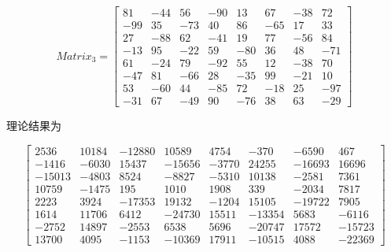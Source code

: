 \documentclass[UTF8]{ctexart}
\begin{document}
\begin{equation}
Matrix_3
=
\left[
\begin{array}{cccccccc}
    81 & -44 & 56 & -90 &  13 & 67 & -38 &  72\\
   -99 &  35 &-73 &  40 &  86 &-65 &  17 &  33\\
    27 & -88 & 62 & -41 &  19 & 77 & -56 &  84\\
   -13 &  95 &-22 &  59 & -80 & 36 &  48 & -71\\
    61 & -24 & 79 & -92 &  55 & 12 & -38 &  70\\
   -47 &  81 &-66 &  28 & -35 & 99 & -21 &  10\\
    53 & -60 & 44 & -85 &  72 &-18 &  25 & -97\\
   -31 &  67 &-49 &  90 & -76 & 38 &  63 & -29
\end{array}
\right]
\end{equation}

理论结果为

\begin{equation}
\left[
\begin{array}{cccccccc}
    
    2536  &  10184 & -12880 &  10589 &  4754  & -370   & -6590  &  467   \\
   -1416  & -6030  &  15437 & -15656 & -3770  &  24255 & -16693 &  16696 \\
   -15013 & -4803  &  8524  & -8827  & -5310  &  10138 & -2581  &  7361  \\
    10759 & -1475  &  195   &  1010  &  1908  &  339   & -2034  &  7817  \\
    2223  &  3924  & -17353 &  19132 & -1204  &  15105 & -19722 &  7905  \\
    1614  &  11706 &  6412  & -24730 &  15511 & -13354 &  5683  & -6116  \\
   -2752  &  14897 & -2553  &  6538  &  5696  & -20747 &  17572 & -15723 \\
    13700 &  4095  & -1153  & -10369 &  17911 & -10515 &  4088  & -22369
\end{array}
\right]
\end{equation}
\end{document}
